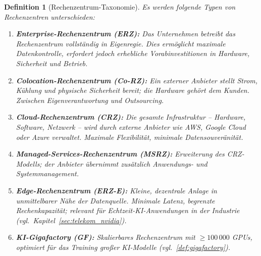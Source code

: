\documentclass[12pt, a4paper, openany]{report}
\newtheorem{definition}[theorem]{Definition}
\begin{document}
\begin{definition}[Rechenzentrum-Taxonomie]
	\label{def:rz_taxonomie}
	Es werden folgende Typen von Rechenzentren unterschieden:
	\begin{enumerate}[label=(\roman*)]
		\item \textbf{Enterprise-Rechenzentrum (ERZ):} Das Unternehmen betreibt
		das Rechenzentrum vollständig in Eigenregie. Dies ermöglicht maximale
		Datenkontrolle, erfordert jedoch erhebliche Vorabinvestitionen in
		Hardware, Sicherheit und Betrieb.
		\item \textbf{Colocation-Rechenzentrum (Co-RZ):} Ein externer Anbieter
		stellt Strom, Kühlung und physische Sicherheit bereit; die Hardware
		gehört dem Kunden. Zwischen Eigenverantwortung und Outsourcing.
		\item \textbf{Cloud-Rechenzentrum (CRZ):} Die gesamte Infrastruktur --
		Hardware, Software, Netzwerk -- wird durch externe Anbieter wie AWS,
		Google Cloud oder Azure verwaltet. Maximale Flexibilität, minimale
		Datensouveränität.
		\item \textbf{Managed-Services-Rechenzentrum (MSRZ):} Erweiterung des
		CRZ-Modells; der Anbieter übernimmt zusätzlich Anwendungs- und
		Systemmanagement.
		\item \textbf{Edge-Rechenzentrum (ERZ-E):} Kleine, dezentrale Anlage in
		unmittelbarer Nähe der Datenquelle. Minimale Latenz, begrenzte
		Rechenkapazität; relevant für Echtzeit-KI-Anwendungen in der
		Industrie (vgl.\ Kapitel~\ref{sec:telekom_nvidia}).
		\item \textbf{KI-Gigafactory (GF):} Skalierbares Rechenzentrum mit
		$\geq 100\,000$ GPUs, optimiert für das Training großer KI-Modelle
		(vgl.\ \cref{def:gigafactory}).
	\end{enumerate}
\end{definition}
\end{document}

